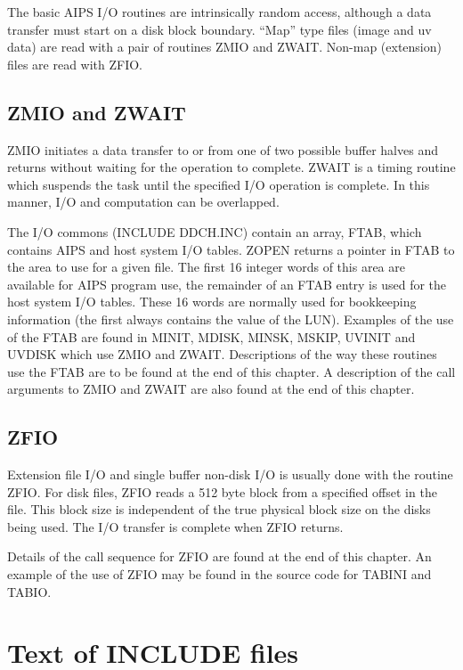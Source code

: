 The basic AIPS I/O routines are intrinsically random access, although
a data transfer must start on a disk block boundary.  ``Map'' type files
(image and uv data) are read with a pair of routines ZMIO and ZWAIT.
Non-map (extension) files are read with ZFIO.

\subsection{ZMIO and ZWAIT}
ZMIO initiates a data transfer to or from one of two possible buffer halves
and returns without waiting for the operation to complete. ZWAIT is a
timing routine which suspends the task until the specified I/O
operation is complete.  In this manner, I/O and computation can be
overlapped.

The I/O commons (INCLUDE DDCH.INC) contain an array,
FTAB, which contains AIPS and host system I/O tables. ZOPEN returns a
pointer in FTAB to the area to use for a given file. The first 16
integer words of this area are available for AIPS program use, the
remainder of an FTAB entry is used for the host system I/O tables.
These 16 words are normally used for bookkeeping information (the
first always contains the value of the LUN).  Examples of the use of
the FTAB are found in MINIT, MDISK, MINSK, MSKIP, UVINIT and UVDISK
which use ZMIO and ZWAIT.  Descriptions of the way these routines use
the FTAB are to be found at the end of this chapter.  A description of
the call arguments to ZMIO and ZWAIT are also found at the end of
this chapter.

\subsection{ZFIO}
Extension file I/O and single buffer non-disk I/O is usually done with
the routine ZFIO.  For disk files, ZFIO reads a 512 byte block from a
specified offset in the file. This block size is independent of the
true physical block size on the disks being used.  The I/O transfer is
complete when ZFIO returns.

Details of the call sequence for ZFIO are found at the end
of this chapter.  An example of the use of ZFIO may be found in the
source code for TABINI and TABIO.

\section{Text of INCLUDE files}


